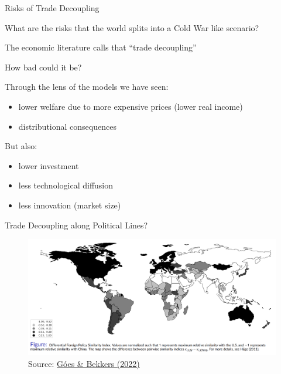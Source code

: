 \documentclass[notes,11pt, aspectratio=169, xcolor=table]{beamer}
\newenvironment{wideitemize}{\itemize\addtolength{\itemsep}{10pt}}{\enditemize}
\begin{document}
\begin{frame}{Risks of Trade Decoupling}

\begin{wideitemize}
    \item What are the risks that the world splits into a Cold War like scenario?
    \item The economic literature calls that ``trade decoupling''
    \item How bad could it be?
    \item Through the lens of the models we have seen:
    \begin{itemize}
        \item lower welfare due to more expensive prices (lower real income)
        \item distributional consequences
    \end{itemize}
    \item But also:
    \begin{itemize}
        \item lower investment
        \item less technological diffusion
        \item less innovation (market size)
        \end{itemize}
\end{wideitemize}


\end{frame}

\begin{frame}{Trade Decoupling along Political Lines?}

\begin{figure}
    \centering
    \includegraphics[width=\linewidth]{figs/decoupling-map.png} \\
    Source: \href{https://www.wto.org/english/res_e/reser_e/ersd202209_e.pdf}{Góes \& Bekkers (2022)}
\end{figure}

\end{frame}
\end{document}
